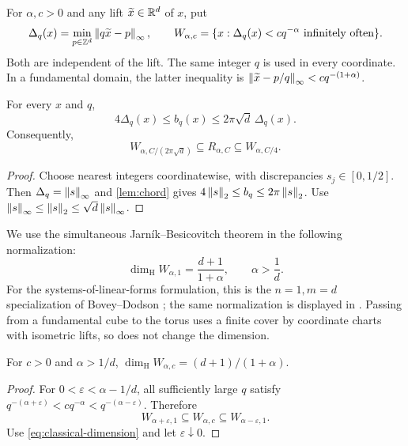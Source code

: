 \documentclass[11pt,a4paper]{article}
\begin{document}
For $\alpha,c>0$ and any lift $\widetilde x\in\mathbb R^d$ of $x$, put
\[
 \Delta_q(x)=\min_{p\in\mathbb Z^d}\left\lVert q\widetilde x-p\right\rVert_\infty,
 \qquad
 W_{\alpha,c}=\{x:\Delta_q(x)<cq^{-\alpha}
                                  \text{ infinitely often}\}.
\]
Both are independent of the lift.  The same integer $q$ is used in every
coordinate.  In a fundamental domain, the latter inequality is
$\left\lVert\widetilde x-p/q\right\rVert_\infty<cq^{-(1+\alpha)}$.

\begin{lemma}
\label{lem:recurrence}
For every $x$ and $q$,
\begin{equation}\label{eq:recurrence-comparison}
 4\Delta_q(x)\leq b_q(x)\leq2\pi\sqrt d\,\Delta_q(x).
\end{equation}
Consequently,
\begin{equation}\label{eq:locus-sandwich}
 W_{\alpha,C/(2\pi\sqrt d)}\subseteq R_{\alpha,C}
                                      \subseteq W_{\alpha,C/4}.
\end{equation}
\end{lemma}

\begin{proof}
Choose nearest integers coordinatewise, with discrepancies
$s_j\in[0,1/2]$.  Then $\Delta_q=\left\lVert s\right\rVert_\infty$ and
\cref{lem:chord} gives $4\left\lVert s\right\rVert_2\leq b_q\leq2\pi\left\lVert s\right\rVert_2$.
Use $\left\lVert s\right\rVert_\infty\leq\left\lVert s\right\rVert_2\leq\sqrt d\left\lVert s\right\rVert_\infty$.
\end{proof}

We use the simultaneous Jarn\'ik--Besicovitch theorem in the following
normalization:
\begin{equation}\label{eq:classical-dimension}
 \dim_{\mathrm H}W_{\alpha,1}=\frac{d+1}{1+\alpha},
                       \qquad\alpha>\frac1d.
\end{equation}
For the systems-of-linear-forms formulation, this is the $n=1,m=d$
specialization of Bovey--Dodson \cite{bovey-dodson}; the same normalization
is displayed in \cite[Section 3.3, equation (11)]{beresnevich-velani}.
Passing from a fundamental cube to the torus uses a finite cover by
coordinate charts with isometric lifts, so does not change the dimension.

\begin{lemma}
\label{lem:constants}
For $c>0$ and $\alpha>1/d$,
$\dim_{\mathrm H}W_{\alpha,c}=(d+1)/(1+\alpha)$.
\end{lemma}

\begin{proof}
For $0<\varepsilon<\alpha-1/d$, all sufficiently large $q$ satisfy
$q^{-(\alpha+\varepsilon)}<cq^{-\alpha}<q^{-(\alpha-\varepsilon)}$.
Therefore
\[
 W_{\alpha+\varepsilon,1}\subseteq W_{\alpha,c}
                                  \subseteq W_{\alpha-\varepsilon,1}.
\]
Use \cref{eq:classical-dimension} and let $\varepsilon\downarrow0$.
\end{proof}
\end{document}
